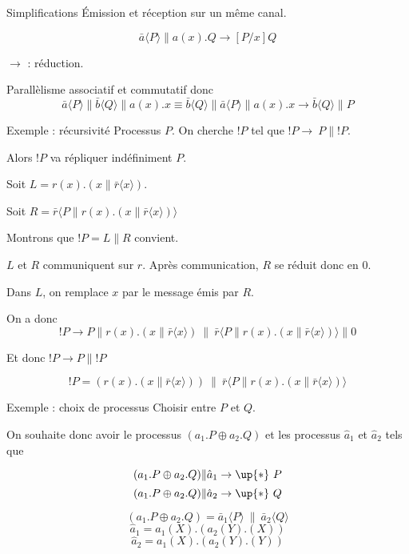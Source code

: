 \documentclass{beamer}
\def\+{\oplus}
\begin{document}
\begin{frame}{Simplifications}
Émission et réception sur un même canal.

$$\bar{a}\langle P\rangle\|a(x).Q \rightarrow [P/x]Q$$

$\rightarrow$ : réduction.

Parallèlisme associatif et commutatif donc 
$$\bar{a}\langle P\rangle\|\bar{b}\langle Q\rangle\|a(x).x \equiv  \bar{b}\langle Q\rangle\|\bar{a}\langle P\rangle\|a(x).x\rightarrow\bar{b}\langle Q\rangle\|P$$
\end{frame}

\begin{frame}{Exemple : récursivité}
Processus $P$. On cherche $!P$ tel que $!P\rightarrow\ P\|!P$.

Alors $!P$ va répliquer indéfiniment $P$.


Soit $L = r(x).(x\|\bar{r}\langle x\rangle)$.

Soit $R = \bar{r}\langle P\|r(x).(x\|\bar{r}\langle x\rangle)\rangle$

Montrons que $!P = L\|R$ convient.

$L$ et $R$ communiquent sur $r$. Après communication, $R$ se réduit donc en $0$.

Dans $L$, on remplace $x$ par le message émis par $R$.


On a donc $$!P\rightarrow P\|r(x).(x\|\bar{r}\langle x\rangle)\ \|\ \bar{r}\langle P\|r(x).(x\|\bar{r}\langle x\rangle)\rangle\| 0$$

Et donc $!P\rightarrow P\|!P$
\begin{alertblock}{}
 $$!P = (r(x).(x\|\bar{r}\langle x\rangle))\ \|\ \bar{r}\langle P\|r(x).(x\|\bar{r}\langle x\rangle)\rangle$$
\end{alertblock}
\end{frame}

\begin{frame}{Exemple : choix de processus}
Choisir entre $P$ et $Q$.

On souhaite donc avoir le processus  $(a_1.P\+ a_2.Q)$ et les processus $\hat{a}_1$ et $\hat{a}_2$ tels que

$$(a_1.P\+ a_2.Q)\|\hat{a}_1\rightarrow\up{*}\ P$$
$$(a_1.P\+ a_2.Q)\|\hat{a}_2\rightarrow\up{*}\ Q$$

\begin{alertblock}{}
$$(a_1.P\+ a_2.Q) = \bar{a}_1\langle P\rangle\ \|\ \bar{a}_2\langle Q\rangle$$
$$\hat{a}_1 = a_1(X).(a_2(Y).(X))$$
$$\hat{a}_2 = a_1(X).(a_2(Y).(Y))$$
\end{alertblock}
\end{frame}
\end{document}
